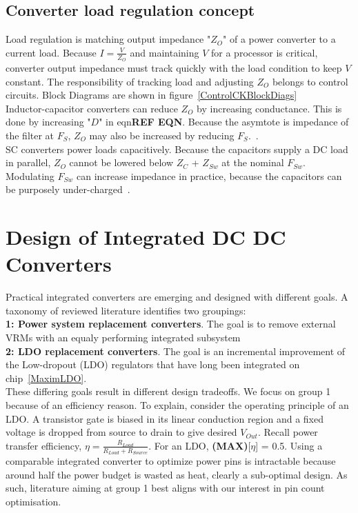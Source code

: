 \documentclass[letterpaper,twocolumn,10pt]{article}
\begin{document}
\subsection{Converter load regulation concept}
Load regulation is matching output impedance "$Z_O$" of a power converter to a current load. Because $I= \frac{V}{Z_O}$ and maintaining $V$ for a processor is critical, converter output impedance must track quickly with the load condition to keep $V$ constant. The responsibility of tracking load and adjusting $Z_O$ belongs to control circuits. Block Diagrams are shown in figure~\ref{ControlCKBlockDiags}\\
Inductor-capacitor converters can reduce $Z_O$ by increasing conductance. This is done by increasing "$D$" in eqn\textbf{REF EQN}. Because the asymtote is impedance of the filter at $F_S$, $Z_O$ may also be increased by reducing $F_S$.~\cite{Alghamdi2012}.\\ %
SC converters power loads capacitively. Because the capacitors supply a DC load in parallel, $Z_O$ cannot be lowered below $Z_C$ + $Z_{Sw}$ at the nominal $F_{Sw}$. Modulating $F_{Sw}$ can increase impedance in practice, because the capacitors can be purposely under-charged~\cite{Seeman2008}.\\

\section{Design of Integrated DC DC Converters}

Practical integrated converters are emerging and designed with different goals. A taxonomy of reviewed literature identifies two groupings:\\
\textbf{1: Power system replacement converters}. The goal is to remove external VRMs with an equaly performing integrated subsystem\\
\textbf{2: LDO replacement converters}. The goal is an incremental improvement of the Low-dropout (LDO) regulators that have long been integrated on chip~\ref{MaximLDO}.\\
These differing goals result in different design tradeoffs. We focus on group 1 because of an efficiency reason. To explain, consider the operating principle of an LDO. A transistor gate is biased in its linear conduction region and a fixed voltage is dropped from source to drain to give desired $V_{Out}$. Recall power transfer efficiency, $\eta = \frac{R_{Load}}{R_{Load} + R_{Source}}$. For an LDO, \textbf{(MAX)}[$\eta$] = 0.5. Using a comparable integrated converter to optimize power pins is intractable because around half the power budget is wasted as heat, clearly a sub-optimal design. As such, literature aiming at group 1 best aligns with our interest in pin count optimisation.\\  
\end{document}
